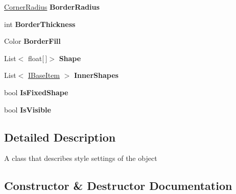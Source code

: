 \begin{DoxyCompactItemize}
\mbox{\hyperlink{class_space_v_i_l_1_1_decorations_1_1_corner_radius}{Corner\+Radius}} {\bfseries Border\+Radius}
\item 
\mbox{\label{class_space_v_i_l_1_1_decorations_1_1_style_a9dbd0d5894d6a79a8c000b2d2d0efaf6}} 
int {\bfseries Border\+Thickness}
\item 
\mbox{\label{class_space_v_i_l_1_1_decorations_1_1_style_a5865135cc75742e9fba77ed0ef29a9b1}} 
Color {\bfseries Border\+Fill}
\item 
\mbox{\label{class_space_v_i_l_1_1_decorations_1_1_style_a7e68b5de2c1c860731ff4a268d80313c}} 
List$<$ float\mbox{[}$\,$\mbox{]}$>$ {\bfseries Shape}
\item 
\mbox{\label{class_space_v_i_l_1_1_decorations_1_1_style_a64c72dd70f7e12132f7be410760b8605}} 
List$<$ \mbox{\hyperlink{interface_space_v_i_l_1_1_core_1_1_i_base_item}{I\+Base\+Item}} $>$ {\bfseries Inner\+Shapes}
\item 
\mbox{\label{class_space_v_i_l_1_1_decorations_1_1_style_a6e12fee329de25c9859554ff6aa9a099}} 
bool {\bfseries Is\+Fixed\+Shape}
\item 
\mbox{\label{class_space_v_i_l_1_1_decorations_1_1_style_a85f93a270aea5a98bf4b90ee4329f9c3}} 
bool {\bfseries Is\+Visible}
\end{DoxyCompactItemize}


\subsection{Detailed Description}
A class that describes style settings of the object 



\subsection{Constructor \& Destructor Documentation}
\mbox{\label{class_space_v_i_l_1_1_decorations_1_1_style_a433e3e497a0884da5d49d327b8ca6703}} 
